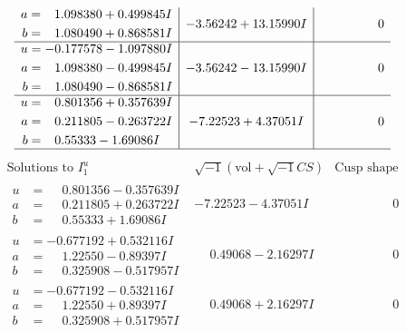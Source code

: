 \documentclass[1p]{elsarticle_modified}
\theoremstyle{definition}
\newcommand{\I}{\sqrt{-1}}
\begin{document}
$$\begin{array}{c|c|c}
\begin{aligned}
a &= \phantom{-}1.098380 + 0.499845 I \\
b &= \phantom{-}1.080490 + 0.868581 I\end{aligned}
 & -3.56242 + 13.15990 I & \phantom{-0.000000 } 0 \\ \hline\begin{aligned}
u &= -0.177578 - 1.097880 I \\
a &= \phantom{-}1.098380 - 0.499845 I \\
b &= \phantom{-}1.080490 - 0.868581 I\end{aligned}
 & -3.56242 - 13.15990 I & \phantom{-0.000000 } 0 \\ \hline\begin{aligned}
u &= \phantom{-}0.801356 + 0.357639 I \\
a &= \phantom{-}0.211805 - 0.263722 I \\
b &= \phantom{-}0.55333 - 1.69086 I\end{aligned}
 & -7.22523 + 4.37051 I & \phantom{-0.000000 } 0\\
 \hline 
 \end{array}$$\newpage$$\begin{array}{c|c|c}  
\text{Solutions to }I^u_{1}& \I (\text{vol} + \sqrt{-1}CS) & \text{Cusp shape}\\
 \hline 
\begin{aligned}
u &= \phantom{-}0.801356 - 0.357639 I \\
a &= \phantom{-}0.211805 + 0.263722 I \\
b &= \phantom{-}0.55333 + 1.69086 I\end{aligned}
 & -7.22523 - 4.37051 I & \phantom{-0.000000 } 0 \\ \hline\begin{aligned}
u &= -0.677192 + 0.532116 I \\
a &= \phantom{-}1.22550 - 0.89397 I \\
b &= \phantom{-}0.325908 - 0.517957 I\end{aligned}
 & \phantom{-}0.49068 - 2.16297 I & \phantom{-0.000000 } 0 \\ \hline\begin{aligned}
u &= -0.677192 - 0.532116 I \\
a &= \phantom{-}1.22550 + 0.89397 I \\
b &= \phantom{-}0.325908 + 0.517957 I\end{aligned}
 & \phantom{-}0.49068 + 2.16297 I & \phantom{-0.000000 } 0 \\ \hline\begin{aligned}

\end{aligned}
\end{array}$$
\end{document}
